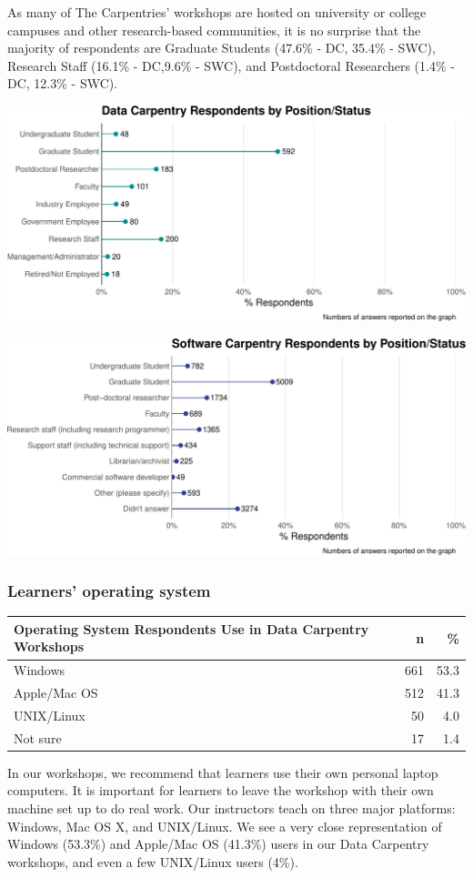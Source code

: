 \documentclass[]{article}
\makeatletter
\def\maxwidth{\ifdim\Gin@nat@width>\linewidth\linewidth\else\Gin@nat@width\fi}
\makeatother
\begin{document}
As many of The Carpentries' workshops are hosted on university or
college campuses and other research-based communities, it is no surprise
that the majority of respondents are Graduate Students (47.6\% - DC,
35.4\% - SWC), Research Staff (16.1\% - DC,9.6\% - SWC), and
Postdoctoral Researchers (1.4\% - DC, 12.3\% - SWC).

\includegraphics[width=\maxwidth]{../figures/dc-status-plot-1}

\includegraphics[width=\maxwidth]{../figures/swc-status-plot-1}

\subsubsection{Learners' operating
system}\label{learners-operating-system}

\begin{longtable}[]{@{}lrr@{}}
\toprule
Operating System Respondents Use in Data Carpentry Workshops & n &
\%\tabularnewline
\midrule
\endhead
Windows & 661 & 53.3\tabularnewline
Apple/Mac OS & 512 & 41.3\tabularnewline
UNIX/Linux & 50 & 4.0\tabularnewline
Not sure & 17 & 1.4\tabularnewline
\bottomrule
\end{longtable}

In our workshops, we recommend that learners use their own personal
laptop computers. It is important for learners to leave the workshop
with their own machine set up to do real work. Our instructors teach on
three major platforms: Windows, Mac OS X, and UNIX/Linux. We see a very
close representation of Windows (53.3\%) and Apple/Mac OS (41.3\%) users
in our Data Carpentry workshops, and even a few UNIX/Linux users (4\%).
\end{document}
